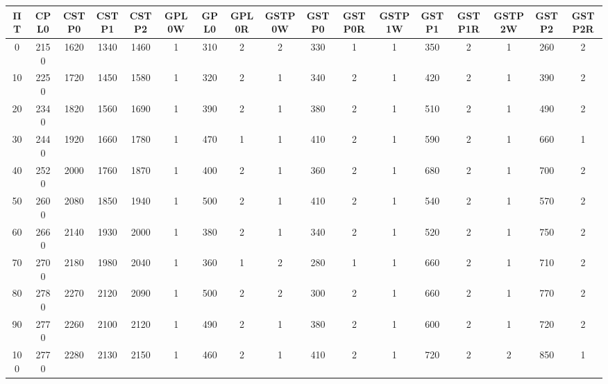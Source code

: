\begin{tabular}{|c|c|c|c|c|c|c|c|c|c|c|c|c|c|c|c|c|}
\hline
ΠΤ&CPL0&CSTP0&CSTP1&CSTP2&GPL0W&GPL0&GPL0R&GSTP0W&GSTP0&GSTP0R&GSTP1W&GSTP1&GSTP1R&GSTP2W&GSTP2&GSTP2R\\\hline
\hline
0&2150&1620&1340&1460&1&310&2&2&330&1&1&350&2&1&260&2\\
\hline
10&2250&1720&1450&1580&1&320&2&1&340&2&1&420&2&1&390&2\\
\hline
20&2340&1820&1560&1690&1&390&2&1&380&2&1&510&2&1&490&2\\
\hline
30&2440&1920&1660&1780&1&470&1&1&410&2&1&590&2&1&660&1\\
\hline
40&2520&2000&1760&1870&1&400&2&1&360&2&1&680&2&1&700&2\\
\hline
50&2600&2080&1850&1940&1&500&2&1&410&2&1&540&2&1&570&2\\
\hline
60&2660&2140&1930&2000&1&380&2&1&340&2&1&520&2&1&750&2\\
\hline
70&2700&2180&1980&2040&1&360&1&2&280&1&1&660&2&1&710&2\\
\hline
80&2780&2270&2120&2090&1&500&2&2&300&2&1&660&2&1&770&2\\
\hline
90&2770&2260&2100&2120&1&490&2&1&380&2&1&600&2&1&720&2\\
\hline
100&2770&2280&2130&2150&1&460&2&1&410&2&1&720&2&2&850&1\\
\hline
\end{tabular}

